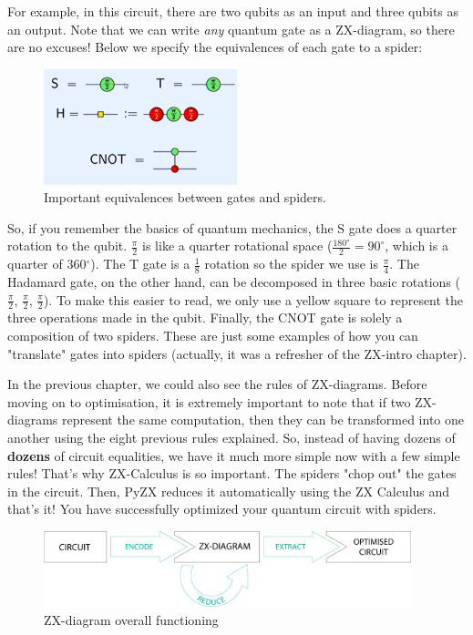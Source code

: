 For example, in this circuit, there are two qubits as an input and three qubits as an output. Note that we can write \textit{any} quantum gate as a ZX-diagram, so there are no excuses! Below we specify the equivalences of each gate to a spider:
\begin{figure}[H]
        \centering
        \includegraphics[width=0.5\textwidth]{Figures/equivalence.spiders.png}
        \caption{Important equivalences between gates and spiders.}
        \label{fig:eq.spiders}
    \end{figure}
So, if you remember the basics of quantum mechanics, the S gate does a quarter rotation to the qubit. $\frac{\pi}{2}$ is like a quarter rotational space ($\frac{180°}{2} = 90^\circ$, which is a quarter of 360$^\circ$). The T gate is a $\frac{1}{8}$ rotation so the spider we use is $\frac{\pi}{4}$. The Hadamard gate, on the other hand, can be decomposed in three basic rotations ($\frac{\pi}{2}$, $\frac{\pi}{2}$, $\frac{\pi}{2}$). To make this easier to read, we only use a yellow square to represent the three operations made in the qubit. Finally, the CNOT gate is solely a composition of two spiders. These are just some examples of how you can "translate" gates into spiders (actually, it was a refresher of the ZX-intro chapter). 

In the previous chapter, we could also see the rules of ZX-diagrams. Before moving on to optimisation, it is extremely important to note that if two ZX-diagrams represent the same computation, then they can be transformed into one another using the eight previous rules explained. So, instead of having dozens of \textbf{dozens} of circuit equalities, we have it much more simple now with a few simple rules! That's why ZX-Calculus is so important. The spiders "chop out" the gates in the circuit. Then, PyZX reduces it automatically using the ZX Calculus and that's it! You have successfully optimized your quantum circuit with spiders.

\begin{figure}[H]
        \centering
        \includegraphics[width = 0.95\textwidth]{Figures/optimisation-roadmap.eps}
        \caption{ZX-diagram overall functioning}
        \label{fig:def-pyzx}
    \end{figure}

